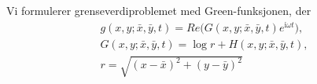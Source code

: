 Vi formulerer grenseverdiproblemet med Green-funksjonen, der
\begin{align}
	g(x,y; \bar{x}, \bar{y}, t) = Re\big( G(x,y; \bar{x}, \bar{y}, t) e^{\mathrm{i} \omega t} \big),\\
	G(x,y; \bar{x}, \bar{y}, t) =\log r + H(x,y; \bar{x}, \bar{y}, t), \\ 
	r = \sqrt{(x- \bar{x})^2 + (y- \bar{y})^2}
\end{align}


